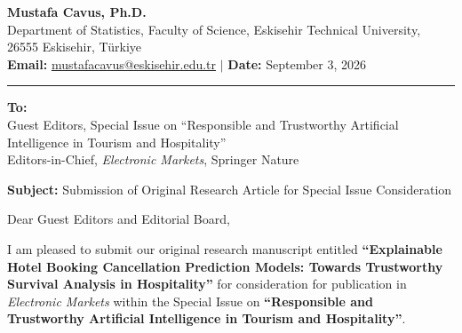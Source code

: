 \documentclass[10.5pt,a4paper]{article}
\begin{document}
\begin{flushright}
    \textbf{Mustafa Cavus, Ph.D.} \\
    Department of Statistics, Faculty of Science, Eskisehir Technical University, 26555 Eskisehir, T\"urkiye \\
    \textbf{Email:} \href{mailto:mustafacavus@eskisehir.edu.tr}{mustafacavus@eskisehir.edu.tr} \quad $\vert$ \quad \textbf{Date:} September 3, 2026
\end{flushright}

\vspace{-0.3cm}
\hrule
\vspace{0.25cm}

\textbf{To:} \\
Guest Editors, Special Issue on ``Responsible and Trustworthy Artificial Intelligence in Tourism and Hospitality'' \\
Editors-in-Chief, \textit{Electronic Markets}, Springer Nature

\textbf{Subject:} Submission of Original Research Article for Special Issue Consideration

Dear Guest Editors and Editorial Board,

I am pleased to submit our original research manuscript entitled \textbf{``Explainable Hotel Booking Cancellation Prediction Models: Towards Trustworthy Survival Analysis in Hospitality''} for consideration for publication in \textit{Electronic Markets} within the Special Issue on \textbf{``Responsible and Trustworthy Artificial Intelligence in Tourism and Hospitality''}.
\end{document}
